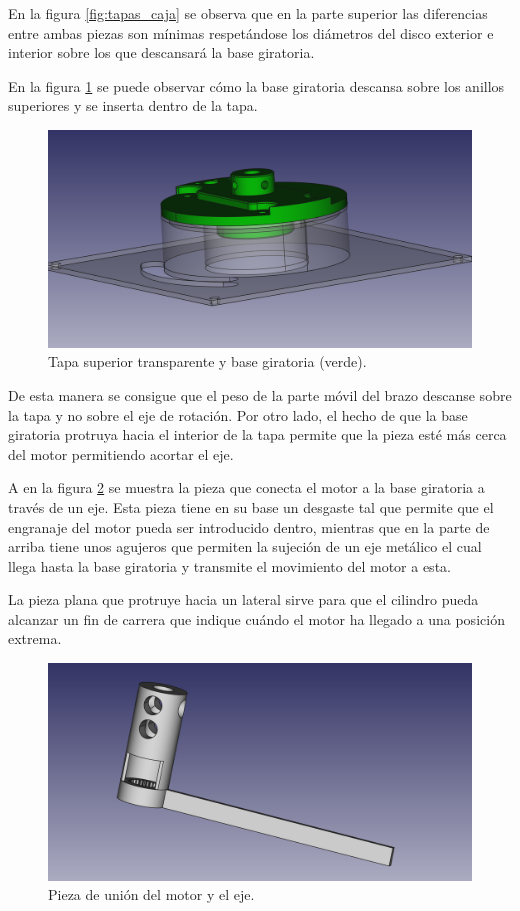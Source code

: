 En la figura \ref{fig:tapas_caja} se observa que en la parte superior las diferencias entre ambas piezas son mínimas respetándose los diámetros del disco exterior e interior sobre los que descansará la base giratoria.

En la figura \ref{fig:tapas_caja_con_disco} se puede observar cómo la base giratoria descansa sobre los anillos superiores y se inserta dentro de la tapa.
\begin{figure}[H]
    \centering
    \includegraphics[width=.9\linewidth]{pictures/TapaSuperiorConDisco.png}
    \caption{Tapa superior transparente y base giratoria (verde).}
    \label{fig:tapas_caja_con_disco}
\end{figure}

De esta manera se consigue que el peso de la parte móvil del brazo descanse sobre la tapa y no sobre el eje de rotación. Por otro lado, el hecho de que la base giratoria protruya hacia el interior de la tapa permite que la pieza esté más cerca del motor permitiendo acortar el eje.

A en la figura \ref{fig:cilindro_con_pletina} se muestra la pieza que conecta el motor a la base giratoria a través de un eje. Esta pieza tiene en su base un desgaste tal que permite que el engranaje del motor pueda ser introducido dentro, mientras que en la parte de arriba tiene unos agujeros que permiten la sujeción de un eje metálico el cual llega hasta la base giratoria y transmite el movimiento del motor a esta.

La pieza plana que protruye hacia un lateral sirve para que el cilindro pueda alcanzar un fin de carrera que indique cuándo el motor ha llegado a una posición extrema.

\begin{figure}[H]
    \centering
    \includegraphics[width=.9\linewidth]{pictures/CilindroConPletina.png}
    \caption{Pieza de unión del motor y el eje.}
    \label{fig:cilindro_con_pletina}
\end{figure}

